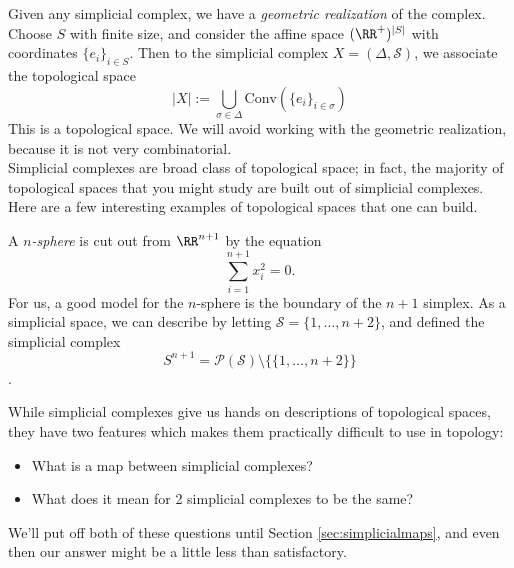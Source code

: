 Given any simplicial complex, we have a \emph{geometric realization} of the complex. Choose $S$ with finite size, and consider the affine space $(\RR^+)^{|S|}$ with coordinates $\{e_i\}_{i\in S}$. Then to the simplicial complex $X=(\Delta, \mathcal S)$, we associate the topological space 
\[|X|:=\bigcup_{\sigma \in \Delta} \text{Conv}(\{e_i\}_{i\in \sigma})\]
 This is a topological space. We will avoid working with the geometric realization, because it is not very combinatorial. \\
 Simplicial complexes are broad class of topological space; in fact, the majority of topological spaces that you might study are built out of simplicial complexes. Here are a few interesting examples of topological spaces that one can build. 
\begin{example}
A \emph{$n$-sphere} is cut out from $\RR^{n+1}$ by the equation
\[\sum_{i=1}^{n+1} x_i^2=0.\]
For us, a good model for the $n$-sphere is the boundary of the $n+1$ simplex. As a simplicial space, we can describe by letting $\mathcal S=\{1,\ldots, n+2\} $, and defined the simplicial complex
\[S^{n+1}=\mathcal P(\mathcal S)\setminus\{\{1,\ldots, n+2\}\}\]
.  \label{def:nsphere}
\end{example}
While simplicial complexes give us hands on descriptions of topological spaces, they have two features which makes them practically difficult to use in topology:
\begin{itemize}
\item What is a map between simplicial complexes?
\item What does it mean for 2 simplicial complexes to be the same?
\end{itemize}
We'll put off both of these questions until Section \ref{sec:simplicialmaps}, and even then our answer might be a little less than satisfactory. 
